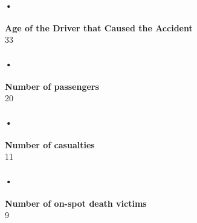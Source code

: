 \documentclass[12pt]{article}
\begin{document}
\paragraph{•}
\textbf{Age of the Driver that Caused the Accident}\\
33

\paragraph{•}
\textbf{Number of passengers}\\
20

\paragraph{•}
\textbf{Number of casualties}\\
11

\paragraph{•}
\textbf{Number of on-spot death victims}\\
9
\end{document}
